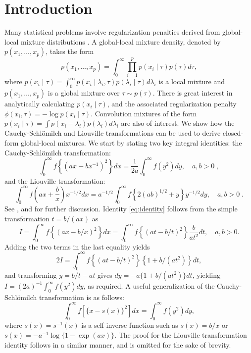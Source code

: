 \documentclass[ECP]{ejpecp} %
\def\CS{Cauchy-Schl\"omilch}
\begin{document}
\section{Introduction}
Many statistical problems involve regularization penalties derived from global-local mixture distributions \cite{polson_data_2011, hans2011comment, bhadra2015horseshoe+}. A global-local mixture density, denoted by $p(x_1, \ldots, x_p)$, takes the form 
\[
p(x_1, \ldots, x_p) = \int_{0}^{\infty}\prod_{i=1}^{p} p(x_i \mid \tau) p(\tau) d\tau, 
\]
where $p(x_i \mid \tau) = \int_{0}^{\infty} p(x_i \mid \lambda_i, \tau) p(\lambda_i \mid \tau) d\lambda_i$ is a local mixture and $p(x_1, \ldots, x_p)$ is a global mixture over $\tau \sim p(\tau)$. There is great interest in analytically calculating $p(x_i \mid \tau)$, and the associated regularization penalty $\phi(x_i, \tau) = -\log p(x_i \mid \tau)$. Convolution mixtures of the form $p(x_i \mid \tau) = \int p(x_i - \lambda_i) p(\lambda_i) d \lambda_i$ are also of interest. We show how the \CS{} and Liouville transformations can be used to derive closed-form global-local mixtures.  We start by stating two key integral identities: the \CS{} transformation:
\begin{equation}
  \int_0^\infty f \left\{ ( a x - b x^{-1} )^2 \right\} d x = \frac{1}{2a} \int_0^\infty f(y^2) d y, \quad a, b >0  \;, \label{eq:identity}
\end{equation}
and the Liouville transformation:
\begin{equation}
  \int_{0}^{\infty} f\left(ax + \frac{b}{x} \right) x^{-1/2}dx = a^{-1/2} \int_{0}^{\infty} f\left\{ 2 (ab)^{1/2} + y \right\} y^{-1/2} dy, \quad a, b >0  \;. 
  \label{eq:liouville}
\end{equation}
See \cite{boros2006irresistible}, \cite{baker2008probabilistic} and \cite{jones_generating_2014} for further discussion. Identity \eqref{eq:identity} follows from the simple transformation $t = b/(a x)$ as
\begin{equation*}
  I = \int_{0}^{\infty} f \left\{(ax - b/x)^2 \right\} dx = \int_{0}^{\infty} f \left\{(at - b/t)^2 \right\} \frac{b}{a t^2} dt, \quad a, b >0.
\end{equation*}
Adding the two terms in the last equality yields 
\[
2 I = \int_{0}^{\infty} f \left\{(at - b/t)^2 \right\} \left\{ 1+{b}/({a t^2}) \right\} dt,
\]
\sloppy
and transforming $y = b/t - at$ gives $dy = -a \{1+{b}/({a t^2})\} dt$, yielding $I = (2a)^{-1} \int_{0}^{\infty} f(y^2) dy$, as required. A useful generalization of the \CS{} transformation is as follows: 
\begin{equation}
  \int_0^\infty f\left[ \{x-s(x)\}^2 \right] dx =  \int_0^\infty f( y^2 ) dy, \label{eq:gen}
\end{equation}
where $s(x)=s^{-1}(x)$ is a self-inverse function such as $s(x) = b/x$ or $s(x) = -a^{-1}\log\{1-\exp(a x)\}$. The proof for the Liouville transformation identity follows in a similar manner, and is omitted for the sake of brevity. %
\end{document}
